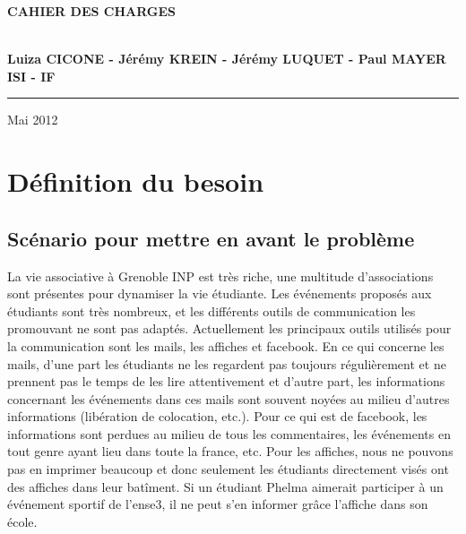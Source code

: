 \documentclass[a4paper, 11px]{article}
\begin{document}
\begin{titlepage}
\begin{center}
\begin{center}
{\Huge \bf CAHIER DES CHARGES}


\end{center}


\vspace{1cm}

\begin{center}
$ $\\
\large{ \textbf{Luiza CICONE - Jérémy KREIN - Jérémy LUQUET - Paul MAYER}}\\
\large{ \textbf{ISI - IF}}
$ $\\
\end{center}
\rule{\linewidth}{.5pt}


\vfill


{\large Mai 2012}

\end{center}
\end{titlepage}

\tableofcontents

\newpage


\section{Définition du besoin}

\subsection{Scénario pour mettre en avant le problème}

La vie associative à Grenoble INP est très riche, une multitude d'associations sont présentes pour dynamiser la vie étudiante.
Les événements proposés aux étudiants sont très nombreux, et les différents outils de communication les promouvant ne sont pas adaptés.
Actuellement les principaux outils utilisés pour la communication sont les mails, les affiches et facebook.
En ce qui concerne les mails, d'une part les étudiants ne les regardent pas toujours régulièrement et ne prennent pas le temps de les lire attentivement et
d'autre part, les informations concernant les événements dans ces mails sont souvent noyées au milieu d'autres informations (libération de colocation, etc.).
Pour ce qui est de facebook, les informations sont perdues au milieu de tous les commentaires, les événements en tout genre ayant lieu dans toute
la france, etc. Pour les affiches, nous ne pouvons pas en imprimer beaucoup et donc seulement les étudiants directement visés ont des affiches dans
leur batîment. Si un étudiant Phelma aimerait participer à un événement sportif de l'ense3, il ne peut s'en informer grâce l'affiche dans son école.
\end{document}
